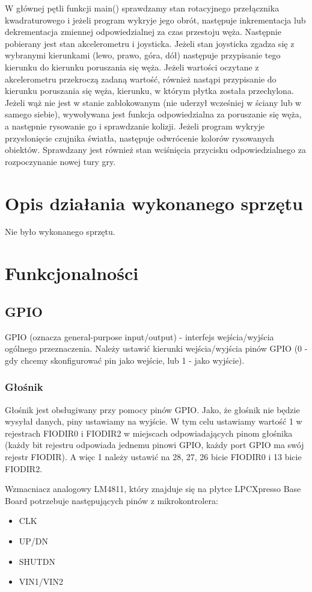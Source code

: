 \documentclass{classrep}
\begin{document}
		W głównej pętli funkcji main() sprawdzamy stan rotacyjnego przełącznika kwadraturowego i jeżeli program wykryje jego obrót, następuje inkrementacja lub dekrementacja zmiennej odpowiedzialnej za czas przestoju węża. Następnie pobierany jest stan akcelerometru i joysticka. Jeżeli stan joysticka zgadza się z wybranymi kierunkami (lewo, prawo, góra, dół) następuje przypisanie tego kierunku do kierunku poruszania się węża. Jeżeli wartości oczytane z akcelerometru przekroczą zadaną wartość, również nastąpi przypisanie do kierunku poruszania się węża, kierunku, w którym płytka została przechylona. Jeżeli wąż nie jest w stanie zablokowanym (nie uderzył wcześniej w ściany lub w samego siebie), wywoływana jest funkcja odpowiedzialna za poruszanie się węża, a następnie rysowanie go i sprawdzanie kolizji.
		Jeżeli program wykryje przysłonięcie czujnika światła, następuje odwrócenie kolorów rysowanych obiektów.
		Sprawdzany jest również stan wciśnięcia przycisku odpowiedzialnego za rozpoczynanie nowej tury gry.
		
	\section{Opis działania wykonanego sprzętu}
	Nie było wykonanego sprzętu.
	\section{Funkcjonalności}
		\subsection{GPIO}
		GPIO (oznacza general-purpose input/output) - interfejs wejścia/wyjścia ogólnego przeznaczenia. Należy ustawić kierunki wejścia/wyjścia pinów GPIO (0 - gdy chcemy skonfigurować pin jako wejście, lub 1 - jako wyjście).
		
		\subsubsection{Głośnik}
		Głośnik jest obsługiwany przy pomocy pinów GPIO.  Jako, że głośnik nie będzie wysyłał danych, piny ustawiamy na wyjście. W tym celu ustawiamy wartość 1 w rejestrach FIODIR0 i FIODIR2 w miejscach odpowiadających pinom głośnika (każdy bit rejestru odpowiada jednemu pinowi GPIO, każdy port GPIO ma swój rejestr FIODIR). A więc 1 należy ustawić na 28, 27, 26 bicie FIODIR0 i 13 bicie FIODIR2.
		
		
		Wzmacniacz analogowy LM4811, który znajduje się na płytce LPCXpresso Base Board potrzebuje następujących pinów z mikrokontrolera:
		\begin{itemize}
			\item CLK
			\item UP/DN
			\item SHUTDN
			\item VIN1/VIN2
		\end{itemize}
	
\end{document}
